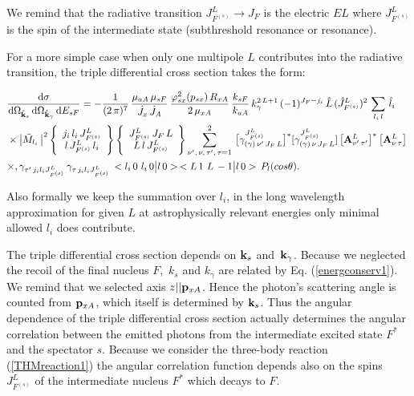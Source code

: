\documentclass[prl,unsortedaddress,groupedaddress,twocolumn,amsmath,amsfonts,amssymb,showpacs,floatfix,nofootinbib]{revtex4}
\begin{document}
We remind that the radiative transition  $J_{F^{(s)}}^{L} \to J_{F}$ is the electric $EL$ where $J_{F^{(s)}}^{L}$ is the spin of the intermediate state (subthreshold resonance or resonance).

For a more simple case when only one multipole $L$ contributes into the radiative transition, the triple differential cross section 
takes the form:
\begin{widetext}
\begin{align}
&\frac{ {\rm d}\sigma}{  {\rm d}{\Omega}_{  {\rm{\bf {\hat k}}}_{s} }\,{\rm d}{\Omega}_{{\rm {\bf {\hat k}}}_{\gamma}}\, {\rm d}{E_{sF}} }= - \frac{1}{(2\,\pi)^{7} }\,\frac{\mu_{aA}\,\mu_{sF}}{{\hat J}_{x}\,{\hat J}_{A}} \,\frac{\varphi_{sx}^{2}(p_{sx})\,R_{xA}}{2\,\mu_{xA}}\,\frac{ k_{sF}}{k_{aA}}\,
 k_{\gamma}^{2\,L+1}\,(-1)^{J_{F}  - j_{i} }\,{\hat L}\,({\hat J}_{F^{(s)}}^{L})^{2}\,
\sum\limits_{l_{i}\,l}\,{\hat l}_{i}\,                                   \nonumber\\
& \times \big|{\tilde M}_{l_{i}}\,\big|^{2}\,\Bigg\lbrace \begin{array}{ccc} j_{i}\,l_{i}\, J_{F^{(s)}}^{L} \\  l\,J_{F^{(s)}}^{L}\,l_{i} \end{array} \Bigg\rbrace\,\Bigg\lbrace \begin{array}{ccc} J_{F^{(s)}}^{L}\, J_{F}\,L \\
L\,l\,J_{F^{(s)}}^{L} \end{array} \Bigg\rbrace   \sum\limits_{\nu', \,\nu,\,\tau',\, \tau=1}^{2}\,\big[\gamma_{ (\gamma)\,\nu'\,J_{F}\,L}^{J_{F^{(s)}}^{L}}  \big]^{*} [\gamma_{(\gamma)\,\nu\,J_{F}\,L}^{J_{F^{(s)}}^{L}} ]\,\big[{\bf A}_{v'\,\tau'}^{L} \big]^{*}\,\big[{\bf A}_{\nu\,\tau}^{L} \big]\     \nonumber\\
& \times ,\gamma_{\tau'\,j_{i}l_{i}J_{F^{(s)}}^{L}}\,\gamma_{\tau\,j_{i}l_{i}J_{F^{(s)}}^{L}} \, <l_{i}\,0\,\,l_{i}\,0\big|l\,0>\,<L\,1\,\,L\,-1 \big| l\,0>\,P_{l}(cos{\theta}).
\label{tripplediffcrsect2}
\end{align}
\end{widetext}
Also formally we keep the summation over $l_{i}$, in the long wavelength approximation for given $L$ at astrophysically relevant energies only minimal allowed $l_{i}$ does contribute. 

The triple differential cross section depends on ${\rm {\bf k}}_{s}$ and $\,{\rm {\bf k}}_{\gamma}$. Because we neglected the recoil of the final nucleus $F$, $\,k_{s}$ and $k_{\gamma}$ are related by Eq. (\ref{energconserv1}). We remind that we selected axis $z||{\rm{\bf p}}_{xA}$.  Hence the photon's scattering angle is counted from ${\rm{\bf p}}_{xA}$, which itself is determined by ${\rm {\bf k}}_{s}$.
 Thus the angular dependence of the triple differential cross section
actually determines the angular correlation between the emitted photons from the intermediate excited state $F^{*}$ and the spectator $s$. Because we consider the three-body reaction (\ref{THMreaction1})
the angular correlation function depends also on the spins $J_{F^{(s)}}^{L}$ of the intermediate nucleus $F^{*}$ which decays to $F$.
\end{document}

